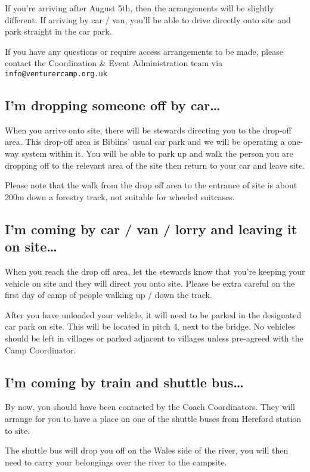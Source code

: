 \documentclass[a4paper, 11pt]{report}
\begin{document}
If you're arriving after August 5th, then the arrangements will be slightly different. If arriving by car / van, you'll be able to drive directly onto site and park straight in the car park.\nl

If you have any questions or require access arrangements to be made, please contact the Coordination \& Event Administration team via \texttt{info@venturercamp.org.uk}

\subsection{I'm dropping someone off by car\ldots}
When you arrive onto site, there will be stewards directing you to the drop-off area. This drop-off area is Biblins' usual car park and we will be operating a one-way system within it. You will be able to park up and walk the person you are dropping off to the relevant area of the site then return to your car and leave site.\nl

Please note that the walk from the drop off area to the entrance of site is about 200m down a forestry track, not suitable for wheeled suitcases.

\subsection{I'm coming by car / van / lorry and leaving it on site\ldots}
When you reach the drop off area, let the stewards know that you're keeping your vehicle on site and they will direct you onto site. Please be extra careful on the first day of camp of people walking up / down the track.\nl

After you have unloaded your vehicle, it will need to be parked in the designated car park on site. This will be located in pitch 4, next to the bridge. No vehicles should be left in villages or parked adjacent to villages unless pre-agreed with the Camp Coordinator.

\subsection{I'm coming by train and shuttle bus\ldots}
By now, you should have been contacted by the Coach Coordinators. They will arrange for you to have a place on one of the shuttle buses from Hereford station to site.\nl

The shuttle bus will drop you off on the Wales side of the river, you will then need to carry your belongings over the river to the campsite. 
\end{document}

